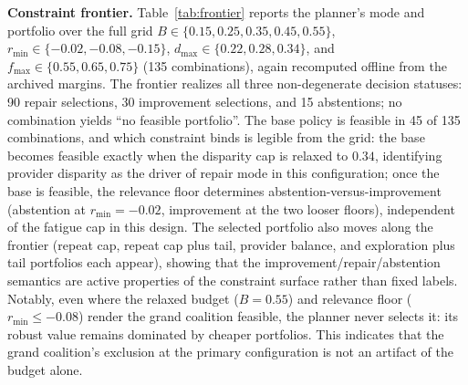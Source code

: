 \documentclass[review]{elsarticle}
\theoremstyle{plain}
\theoremstyle{definition}
\theoremstyle{remark}
\begin{document}
\textbf{Constraint frontier.} Table~\ref{tab:frontier} reports the planner's mode and portfolio over the full grid $B\in\{0.15,0.25,0.35,0.45,0.55\}$, $r_{\min}\in\{-0.02,-0.08,-0.15\}$, $d_{\max}\in\{0.22,0.28,0.34\}$, and $f_{\max}\in\{0.55,0.65,0.75\}$ (135 combinations), again recomputed offline from the archived margins. The frontier realizes all three non-degenerate decision statuses: 90 repair selections, 30 improvement selections, and 15 abstentions; no combination yields ``no feasible portfolio''. The base policy is feasible in 45 of 135 combinations, and which constraint binds is legible from the grid: the base becomes feasible exactly when the disparity cap is relaxed to $0.34$, identifying provider disparity as the driver of repair mode in this configuration; once the base is feasible, the relevance floor determines abstention-versus-improvement (abstention at $r_{\min}=-0.02$, improvement at the two looser floors), independent of the fatigue cap in this design. The selected portfolio also moves along the frontier (repeat cap, repeat cap plus tail, provider balance, and exploration plus tail portfolios each appear), showing that the improvement/repair/abstention semantics are active properties of the constraint surface rather than fixed labels. Notably, even where the relaxed budget ($B=0.55$) and relevance floor ($r_{\min}\leq-0.08$) render the grand coalition feasible, the planner never selects it: its robust value remains dominated by cheaper portfolios. This indicates that the grand coalition's exclusion at the primary configuration is not an artifact of the budget alone.
\end{document}
